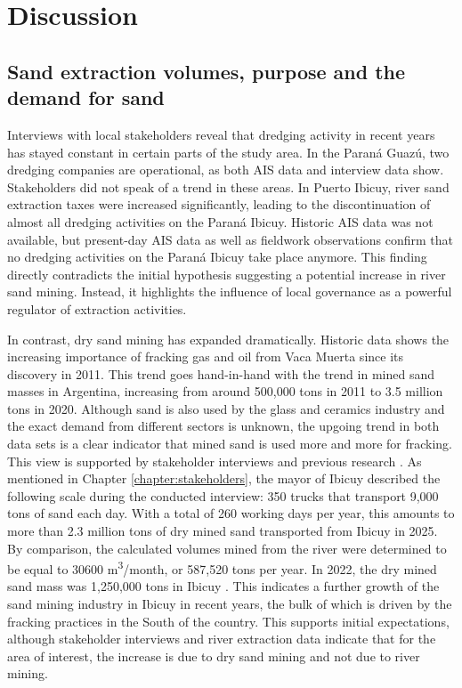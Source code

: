 \chapter{Discussion}

\section{Sand extraction volumes, purpose and the demand for sand}
Interviews with local stakeholders reveal that dredging activity in recent years has stayed constant in certain parts of the study area. In the Paraná Guazú, two dredging companies are operational, as both AIS data and interview data show. Stakeholders did not speak of a trend in these areas. In Puerto Ibicuy, river sand extraction taxes were increased significantly, leading to the discontinuation of almost all dredging activities on the Paraná Ibicuy. Historic AIS data was not available, but present-day AIS data as well as fieldwork observations confirm that no dredging activities on the Paraná Ibicuy take place anymore. This finding directly contradicts the initial hypothesis suggesting a potential increase in river sand mining. Instead, it highlights the influence of local governance as a powerful regulator of extraction activities.

In contrast, dry sand mining has expanded dramatically. Historic data shows the increasing importance of fracking gas and oil from Vaca Muerta since its discovery in 2011. This trend goes hand-in-hand with the trend in mined sand masses in Argentina, increasing from around 500,000 tons in 2011 to 3.5 million tons in 2020. Although sand is also used by the glass and ceramics industry and the exact demand from different sectors is unknown, the upgoing trend in both data sets is a clear indicator that mined sand is used more and more for fracking. This view is supported by stakeholder interviews and previous research \autocite{fogliaSedArena2023} \autocite{secretariadepoliticamineraArenasParaFracking2019}. As mentioned in Chapter \ref{chapter:stakeholders}, the mayor of Ibicuy described the following scale during the conducted interview: 350 trucks that transport 9,000 tons of sand each day. With a total of 260 working days per year, this amounts to more than 2.3 million tons of dry mined sand transported from Ibicuy in 2025. By comparison, the calculated volumes mined from the river were determined to be equal to 30600 m\textsuperscript{3}/month, or 587,520 tons per year. In 2022, the dry mined sand mass was 1,250,000 tons in Ibicuy \autocite{fogliaSedArena2023}. This indicates a further growth of the sand mining industry in Ibicuy in recent years, the bulk of which is driven by the fracking practices in the South of the country. This supports initial expectations, although stakeholder interviews and river extraction data indicate that for the area of interest, the increase is due to dry sand mining and not due to river mining.

